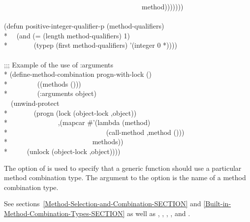 \begin{defmac}
\begin{lisp}
~~~~~~~~~~~~~~~~~~~~~~~~~~~~~~~~~~~~~~~~method))))))) \\
\\
(defun positive-integer-qualifier-p (method-qualifiers) \\*
~~(and (= (length method-qualifiers) 1) \\*
~~~~~~~(typep (first method-qualifiers) '(integer 0 *)))) \\
\\
;;; Example of the use of :arguments \\*
(define-method-combination progn-with-lock () \\*
~~~~~~~~((methods ())) \\*
~~~~~~~~(:arguments object) \\
~~{\Xbq}(unwind-protect \\*
~~~~~~~(progn (lock (object-lock ,object)) \\*
~~~~~~~~~~~~~~,{\Xatsign}(mapcar \#'(lambda (method) \\*
~~~~~~~~~~~~~~~~~~~~~~~~~~~~{\Xbq}(call-method ,method ())) \\*
~~~~~~~~~~~~~~~~~~~~~~~~methods)) \\*
~~~~~(unlock (object-lock ,object))))
\end{lisp}



The  option of  is used to
specify that a generic function should use a particular method
combination type.  The argument to the 
option is the name of a method combination type.
 
See sections~\ref{Method-Selection-and-Combination-SECTION} and
\ref{Built-in-Method-Combination-Types-SECTION} as well as
,
,
,
,
and .
\end{defmac}



